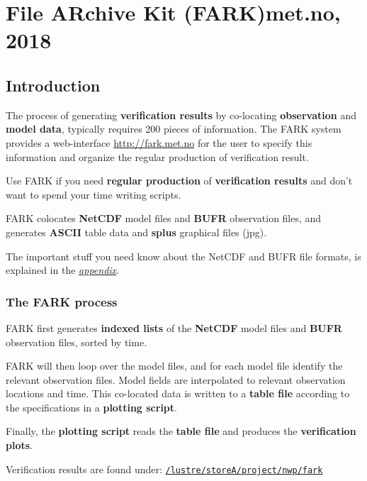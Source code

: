\documentclass[letterpaper,10pt,twoside,twocolumn,openany]{book}
\begin{document}

\chapter{File ARchive Kit (FARK)\tiny{met.no, 2018}}

\section{Introduction}
The process of generating {\bf verification results} by co-locating {\bf observation} and {\bf model data}, 
typically requires 200 pieces of information.
The FARK system provides a web-interface \url{http://fark.met.no} for the user to specify this information and
organize the regular production of verification result.

\begin{quotebox}
   Use FARK if you need {\bf regular production} of {\bf verification results} 
   and don't want to spend your time writing scripts.
\end{quotebox}

FARK colocates {\bf NetCDF} model files and {\bf BUFR} observation files, 
and generates {\bf ASCII} table data and {\bf splus} graphical files (jpg).

The important stuff you need know about the NetCDF and BUFR file formats, is explained
in the \hyperlink{appendix}{{\em appendix}}.

\subsection{The FARK process}

FARK first generates {\bf indexed lists} of the {\bf NetCDF} model files 
and {\bf BUFR} observation files, sorted by time.

FARK will then loop over the model files, and for each model file identify the relevant observation files.
Model fields are interpolated to relevant observation locations and time.
This co-located data is written to a {\bf table file} according to the specifications in a {\bf plotting script}.

Finally, the {\bf plotting script} reads the {\bf table file} and produces the {\bf verification plots}.

\begin{quotebox}
Verification results are found under:
\href{/lustre/storeA/project/nwp/fark/.}{\lstinline!/lustre/storeA/project/nwp/fark!}
\end{quotebox}
\end{document}
